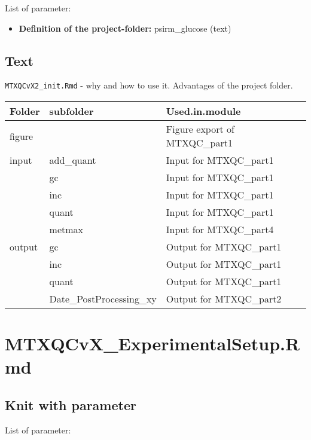 \documentclass[]{book}
\providecommand{\tightlist}{%
  \setlength{\itemsep}{0pt}\setlength{\parskip}{0pt}}
\begin{document}
List of parameter:

\begin{itemize}
\tightlist
\item
  \textbf{Definition of the project-folder:} psirm\_glucose (text)
\end{itemize}

\hypertarget{text}{%
\section{Text}\label{text}}

\texttt{MTXQCvX2\_init.Rmd} - why and how to use it. Advantages of the project folder.

\begin{tabu} to 
\toprule
Folder & subfolder & Used.in.module\\
\midrule
{}  figure &  & Figure export of MTXQC\_part1\\
input & add\_quant & Input for MTXQC\_part1\\
   & gc & Input for MTXQC\_part1\\
 & inc & Input for MTXQC\_part1\\
   & quant & Input for MTXQC\_part1\\
\addlinespace
 & metmax & Input for MTXQC\_part4\\
  output & gc & Output for MTXQC\_part1\\
 & inc & Output for MTXQC\_part1\\
   & quant & Output for MTXQC\_part1\\
 & Date\_PostProcessing\_xy & Output for MTXQC\_part2\\
\bottomrule
\end{tabu}

\hypertarget{ExpSetup}{%
\chapter{MTXQCvX\_ExperimentalSetup.Rmd}\label{ExpSetup}}

\hypertarget{knit-with-parameter-1}{%
\section{Knit with parameter}\label{knit-with-parameter-1}}

List of parameter:
\end{document}
